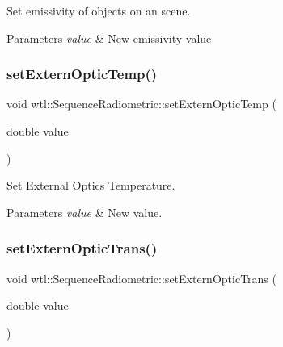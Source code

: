 Set emissivity of objects on an scene. 


\begin{DoxyParams}{Parameters}
{\em value} & New emissivity value \\
\hline
\end{DoxyParams}
\mbox{\label{classwtl_1_1_sequence_radiometric_ae34dbec81e6a10de1456e3b4688cfe3c}} 
\subsubsection{\texorpdfstring{set\+Extern\+Optic\+Temp()}{setExternOpticTemp()}}
{\footnotesize\ttfamily void wtl\+::\+Sequence\+Radiometric\+::set\+Extern\+Optic\+Temp (\begin{DoxyParamCaption}\item[{double}]{value }\end{DoxyParamCaption})}



Set External Optics Temperature. 


\begin{DoxyParams}{Parameters}
{\em value} & New value. \\
\hline
\end{DoxyParams}
\mbox{\label{classwtl_1_1_sequence_radiometric_a4d8e72885a532ca7f69a08f81f6595cd}} 
\subsubsection{\texorpdfstring{set\+Extern\+Optic\+Trans()}{setExternOpticTrans()}}
{\footnotesize\ttfamily void wtl\+::\+Sequence\+Radiometric\+::set\+Extern\+Optic\+Trans (\begin{DoxyParamCaption}\item[{double}]{value }\end{DoxyParamCaption})}




